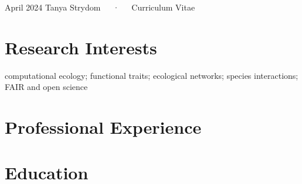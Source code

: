 \documentclass[11pt,a4paper,]{awesome-cv}
\begin{document}
\makecvheader

\makecvfooter
  {April 2024}
    {Tanya Strydom~~~·~~~Curriculum Vitae}
  {\thepage}





\section{\texorpdfstring{ Research
Interests}{ Research Interests}}\label{research-interests}

computational ecology; functional traits; ecological networks; species
interactions; FAIR and open science

\section{\texorpdfstring{ Professional
Experience}{ Professional Experience}}\label{professional-experience}

\begin{cventries}
\end{cventries}

\section{\texorpdfstring{
Education}{ Education}}\label{education}
\end{document}
